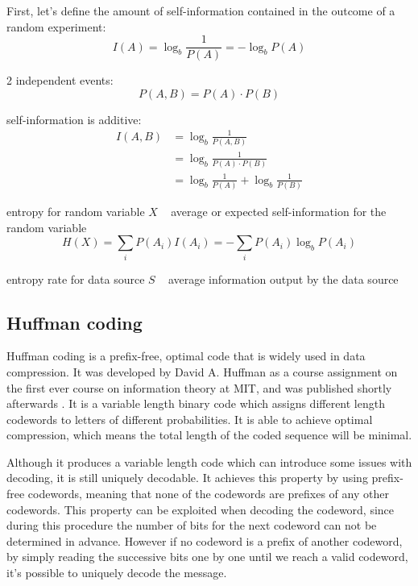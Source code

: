 \documentclass{diploma_style}
\begin{document}
First, let's define the amount of self-information contained in the outcome of a random experiment:
\begin{equation}
I(A) = \log_b \frac{1}{P(A)} = - \log_b P(A)
\end{equation}

2 independent events:
\begin{equation}
P(A,B) = P(A) \cdot P(B)
\end{equation}

self-information is additive:
\begin{align}
I(A,B) &= \log_b \frac{1}{P(A,B)} \\
&= \log_b \frac{1}{P(A) \cdot P(B)} \\
&= \log_b \frac{1}{P(A)} + \log_b \frac{1}{P(B)}
\end{align}

entropy for random variable $X$ ~ average or expected self-information for the random variable
\begin{equation}
H(X) = \sum_i P(A_i)I(A_i) = - \sum_i P(A_i) \log_b P(A_i)
\end{equation}

entropy rate for data source $S$ ~ average information output by the data source

\subsection{Huffman coding}
Huffman coding is a prefix-free, optimal code that is widely used in data compression. It was developed by David A. Huffman as a course assignment on the first ever course on information theory at MIT, and was published shortly afterwards \cite{huffman_method_1952}. It is a variable length binary code which assigns different length codewords to letters of different probabilities. It is able to achieve optimal compression, which means the total length of the coded sequence will be minimal.

Although it produces a variable length code which can introduce some issues with decoding, it is still uniquely decodable. It achieves this property by using prefix-free codewords, meaning that none of the codewords are prefixes of any other codewords. This property can be exploited when decoding the codeword, since during this procedure the number of bits for the next codeword can not be determined in advance. However if no codeword is a prefix of another codeword, by simply reading the successive bits one by one until we reach a valid codeword, it's possible to uniquely decode the message.
\end{document}
